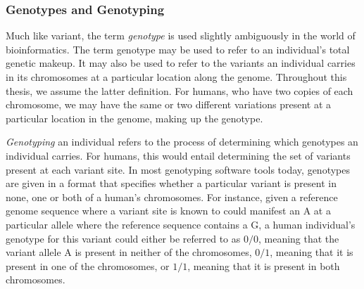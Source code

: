 \subsubsection{Genotypes and Genotyping} \label{background:biology:genotype_and_genotyping}
Much like variant, the term \textit{genotype} is used slightly ambiguously in the world of bioinformatics. 
The term genotype may be used to refer to an individual's total genetic makeup.
It may also be used to refer to the variants an individual carries in its chromosomes at a particular location along the genome.
Throughout this thesis, we assume the latter definition.
For humans, who have two copies of each chromosome, we may have the same or two different variations present at a particular location in the genome, making up the genotype.

\textit{Genotyping} an individual refers to the process of determining which genotypes an individual carries. 
For humans, this would entail determining the set of variants present at each variant site.
In most genotyping software tools today, genotypes are given in a format that specifies whether a particular variant is present in none, one or both of a human's chromosomes.
For instance, given a reference genome sequence where a variant site is known to could manifest an A at a particular allele where the reference sequence contains a G, a human individual's genotype for this variant could either be referred to as $0/0$, meaning that the variant allele A is present in neither of the chromosomes, $0/1$, meaning that it is present in one of the chromosomes, or $1/1$, meaning that it is present in both chromosomes.


